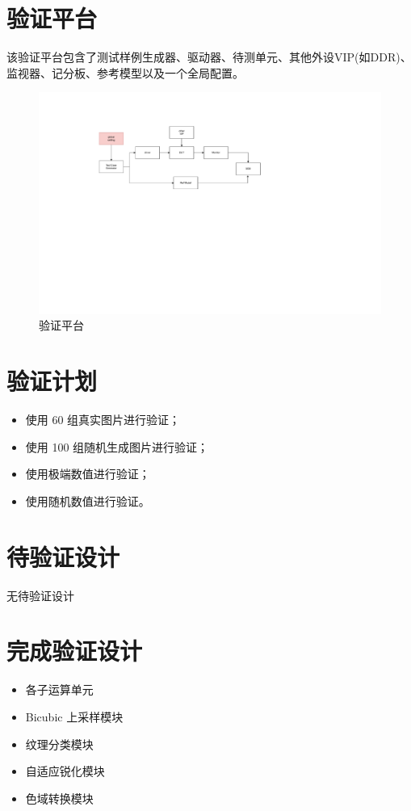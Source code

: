 \documentclass[12pt, a4paper, oneside]{ctexbook}
\begin{document}
		\section{验证平台}
		该验证平台包含了测试样例生成器、驱动器、待测单元、其他外设VIP(如DDR)、监视器、记分板、参考模型以及一个全局配置。	
		\begin{figure}[h]
			\centering
			\includegraphics[scale=0.7]{pic/testbench}
			\caption{验证平台}
			\label{fig:testbench}
		\end{figure}

		\section{验证计划}
		\begin{itemize}
			\item 使用 60 组真实图片进行验证；
   			\item 使用 100 组随机生成图片进行验证；
      		\item 使用极端数值进行验证；
        	\item 使用随机数值进行验证。
		\end{itemize}

		\section{待验证设计}
			无待验证设计

		\section{完成验证设计}
			\begin{itemize}
				\item 各子运算单元
				\item Bicubic 上采样模块
				\item 纹理分类模块
				\item 自适应锐化模块
				\item 色域转换模块
			\end{itemize}
\end{document}
